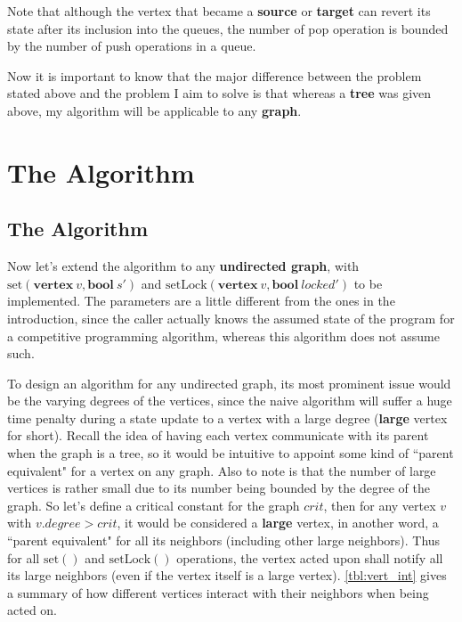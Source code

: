 \documentclass[12pt]{report}
\begin{document}
Note that although the vertex that became a \textbf{source} or \textbf{target} can revert its state after its inclusion into the queues, the number of pop operation is bounded by the number of push operations in a queue.

Now it is important to know that the major difference between the problem stated above and the problem I aim to solve is that whereas a \textbf{tree} was given above, my algorithm will be applicable to any \textbf{graph}.

\pagebreak

\chapter{The Algorithm}

\section{The Algorithm}
Now let's extend the algorithm to any \textbf{undirected graph},
with $ \mathrm{set}(\mathbf{vertex}\ v, \mathbf{bool}\ s') $ and $ \mathrm{setLock}(\mathbf{vertex}\ v, \mathbf{bool}\ \mathit{locked}') $ to be implemented.
The parameters are a little different from the ones in the introduction,
since the caller actually knows the assumed state of the program for a competitive programming algorithm, whereas this algorithm does not assume such.

To design an algorithm for any undirected graph, its most prominent issue would be the varying degrees of the vertices,
since the naive algorithm will suffer a huge time penalty during a state update to a vertex with a large degree (\textbf{large} vertex for short).
Recall the idea of having each vertex communicate with its parent when the graph is a tree,
so it would be intuitive to appoint some kind of ``parent equivalent" for a vertex on any graph.
Also to note is that the number of large vertices is rather small due to its number being bounded by the degree of the graph.
So let's define a critical constant for the graph $ \mathit{crit} $, then for any vertex $ v $ with $ v.\mathit{degree} > \mathit{crit} $,
it would be considered a \textbf{large} vertex,
in another word, a ``parent equivalent" for all its neighbors (including other large neighbors).
Thus for all $ \mathrm{set}() $ and $ \mathrm{setLock}() $ operations, the vertex acted upon shall notify all its large neighbors (even if the vertex itself is a large vertex).
\ref{tbl:vert_int} gives a summary of how different vertices interact with their neighbors when being acted on.
\end{document}
